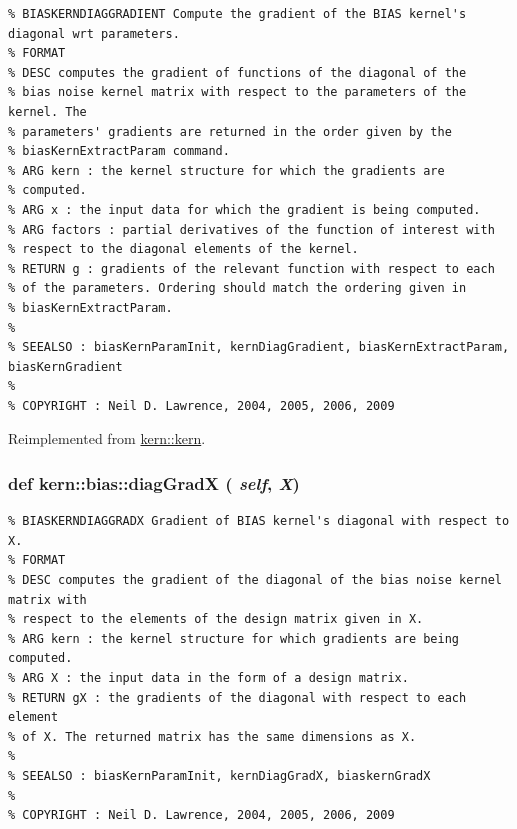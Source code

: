 \footnotesize\begin{verbatim}% BIASKERNDIAGGRADIENT Compute the gradient of the BIAS kernel's diagonal wrt parameters.
% FORMAT
% DESC computes the gradient of functions of the diagonal of the
% bias noise kernel matrix with respect to the parameters of the kernel. The
% parameters' gradients are returned in the order given by the
% biasKernExtractParam command.
% ARG kern : the kernel structure for which the gradients are
% computed.
% ARG x : the input data for which the gradient is being computed.
% ARG factors : partial derivatives of the function of interest with
% respect to the diagonal elements of the kernel.
% RETURN g : gradients of the relevant function with respect to each
% of the parameters. Ordering should match the ordering given in
% biasKernExtractParam.
%
% SEEALSO : biasKernParamInit, kernDiagGradient, biasKernExtractParam, biasKernGradient
%
% COPYRIGHT : Neil D. Lawrence, 2004, 2005, 2006, 2009

\end{verbatim}
\normalsize
 

Reimplemented from \hyperlink{classkern_1_1kern}{kern::kern}.\hypertarget{classkern_1_1bias_ccc65546498307dfbc396d3612b826fe}{
\subsubsection[{diagGradX}]{\setlength{\rightskip}{0pt plus 5cm}def kern::bias::diagGradX ( {\em self}, \/   {\em X})}}
\label{classkern_1_1bias_ccc65546498307dfbc396d3612b826fe}




\footnotesize\begin{verbatim}% BIASKERNDIAGGRADX Gradient of BIAS kernel's diagonal with respect to X.
% FORMAT
% DESC computes the gradient of the diagonal of the bias noise kernel matrix with
% respect to the elements of the design matrix given in X.
% ARG kern : the kernel structure for which gradients are being computed.
% ARG X : the input data in the form of a design matrix.
% RETURN gX : the gradients of the diagonal with respect to each element
% of X. The returned matrix has the same dimensions as X.
%
% SEEALSO : biasKernParamInit, kernDiagGradX, biaskernGradX
%
% COPYRIGHT : Neil D. Lawrence, 2004, 2005, 2006, 2009

\end{verbatim}
\normalsize
 

